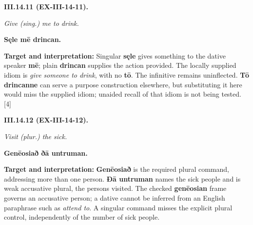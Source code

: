 \par\begin{minipage}{\linewidth}\raggedright
\textbf{III.14.11 (EX-III-14-11).}

\emph{Give (sing.) me to drink.}

\textbf{Sęle mē drincan.}

\textbf{Target and interpretation:} Singular \textbf{sęle} gives something to the dative speaker \textbf{mē}; plain \textbf{drincan} supplies the action provided. The locally supplied idiom is \emph{give someone to drink}, with no \textbf{tō}. The infinitive remains uninflected. \textbf{Tō drincanne} can serve a purpose construction elsewhere, but substituting it here would miss the supplied idiom; unaided recall of that idiom is not being tested. [4]

\end{minipage}\par\addvspace{4pt}

\par\begin{minipage}{\linewidth}\raggedright
\textbf{III.14.12 (EX-III-14-12).}

\emph{Visit (plur.) the sick.}

\textbf{Genēosiað ðā untruman.}

\textbf{Target and interpretation:} \textbf{Genēosiað} is the required plural command, addressing more than one person. \textbf{Ðā untruman} names the sick people and is weak accusative plural, the persons visited. The checked \textbf{genēosian} frame governs an accusative person; a dative cannot be inferred from an English paraphrase such as \emph{attend to}. A singular command misses the explicit plural control, independently of the number of sick people.

\end{minipage}\par\addvspace{4pt}

